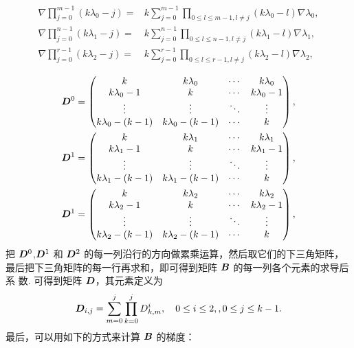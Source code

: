 \documentclass{article}
\begin{document}
\begin{align*}
    \nabla \prod_{j = 0}^{m - 1} (k\lambda_0 - j)
    = & k\sum_{j=0}^{m - 1}\prod_{0\le l \le m-1, l\not= j}(k\lambda_0 -
    l)\nabla \lambda_0,\\
    \nabla \prod_{j = 0}^{n - 1} (k\lambda_1 - j)
    = & k\sum_{j=0}^{n - 1}\prod_{0\le l \le n-1, l\not= j}(k\lambda_1 -
    l)\nabla \lambda_1,\\
    \nabla \prod_{j = 0}^{r - 1} (k\lambda_2 - j)
    = & k\sum_{j=0}^{r - 1}\prod_{0\le l \le r-1, l\not= j}(k\lambda_2 -
    l)\nabla \lambda_2,\\
\end{align*}
\begin{align*}
{\boldsymbol D}^0 = 
\begin{pmatrix}
k & k\lambda_0 & \cdots & k\lambda_0 \\
k\lambda_0 - 1 & k & \cdots & k\lambda_0 - 1 \\
\vdots & \vdots & \ddots & \vdots \\
k\lambda_0 - (k-1) & k\lambda_0 - (k-1) & \cdots & k 
\end{pmatrix},\\ 
{\boldsymbol D}^1 = 
\begin{pmatrix}
k & k\lambda_1 & \cdots & k\lambda_1 \\
k\lambda_1 - 1 & k & \cdots & k\lambda_1 - 1 \\
\vdots & \vdots & \ddots & \vdots \\
k\lambda_1 - (k-1) & k\lambda_1 - (k-1) & \cdots & k 
\end{pmatrix},\\ 
{\boldsymbol D}^1 = 
\begin{pmatrix}
k & k\lambda_2 & \cdots & k\lambda_2 \\
k\lambda_2 - 1 & k & \cdots & k\lambda_2 - 1 \\
\vdots & \vdots & \ddots & \vdots \\
k\lambda_2 - (k-1) & k\lambda_2 - (k-1) & \cdots & k 
\end{pmatrix},\\
\end{align*}
把 ${\boldsymbol D}^0$,${\boldsymbol D}^1$ 和 ${\boldsymbol D}^2$ 的每一列沿行的方向做累乘运算，然后取它们的下三角矩阵，
最后把下三角矩阵的每一行再求和，即可得到矩阵 ${\boldsymbol B}$ 的每一列各个元素的求导后系
数. 可得到矩阵 ${\boldsymbol D}$，其元素定义为 
$$
{\boldsymbol D}_{i,j} = \sum_{m=0}^j\prod_{k=0}^j D^i_{k, m},\quad 0 \le i \le 2,
, 0 \le j \le k-1.
$$
最后，可以用如下的方式来计算 ${\boldsymbol B}$ 的梯度：
\end{document}
